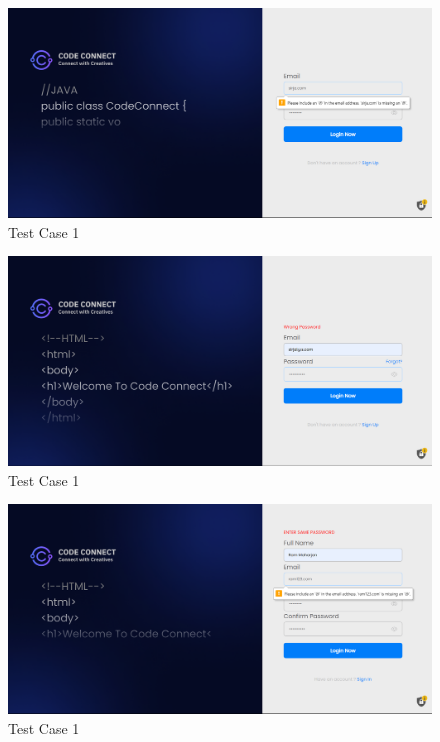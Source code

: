 \begin{figure}[ht]
    \centering
    \includegraphics[width=1\textwidth]{4ImplementationAndTesting/screenshots/email-err-signin.png}
    \caption{Test Case 1}
    \label{fig: Incorrect email Format}

\end{figure}
\begin{figure}[ht]
    \centering
    \includegraphics[width=1\textwidth]{4ImplementationAndTesting/screenshots/signin-pass-err.png}
    \caption{Test Case 1}
    \label{fig: Incorrect Password}
\end{figure}
\begin{figure}[ht]
    \centering
    \includegraphics[width=1\textwidth]{4ImplementationAndTesting/screenshots/signup-same-pass.png}
    \caption{Test Case 1}
    \label{fig: Incorrect Confirm Password}
\end{figure}

